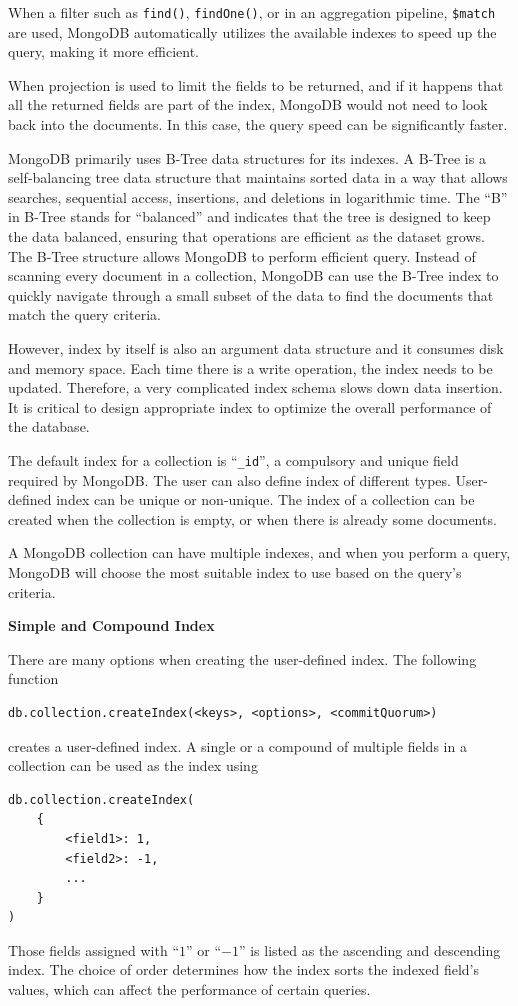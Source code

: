 When a filter such as \verb|find()|, \verb|findOne()|, or in an aggregation pipeline, \verb|$match| are used, MongoDB automatically utilizes the available indexes to speed up the query, making it more efficient.

When projection is used to limit the fields to be returned, and if it happens that all the returned fields are part of the index, MongoDB would not need to look back into the documents. In this case, the query speed can be significantly faster.

\begin{shortbox}

MongoDB primarily uses B-Tree data structures for its indexes. A B-Tree is a self-balancing tree data structure that maintains sorted data in a way that allows searches, sequential access, insertions, and deletions in logarithmic time. The ``B'' in B-Tree stands for ``balanced'' and indicates that the tree is designed to keep the data balanced, ensuring that operations are efficient as the dataset grows. The B-Tree structure allows MongoDB to perform efficient query. Instead of scanning every document in a collection, MongoDB can use the B-Tree index to quickly navigate through a small subset of the data to find the documents that match the query criteria.
\end{shortbox}

However, index by itself is also an argument data structure and it consumes disk and memory space. Each time there is a write operation, the index needs to be updated. Therefore, a very complicated index schema slows down data insertion. It is critical to design appropriate index to optimize the overall performance of the database.

The default index for a collection is ``\verb|_id|'', a compulsory and unique field required by MongoDB. The user can also define index of different types. User-defined index can be unique or non-unique. The index of a collection can be created when the collection is empty, or when there is already some documents.

A MongoDB collection can have multiple indexes, and when you perform a query, MongoDB will choose the most suitable index to use based on the query's criteria.

\vspace{0.1in}
\noindent \textbf{Simple and Compound Index}
\vspace{0.1in}

There are many options when creating the user-defined index. The following function 
\begin{lstlisting}
db.collection.createIndex(<keys>, <options>, <commitQuorum>)
\end{lstlisting}
creates a user-defined index. A single or a compound of multiple fields in a collection can be used as the index using
\begin{lstlisting}
db.collection.createIndex(
	{
		<field1>: 1,
		<field2>: -1,
		...
	}
)
\end{lstlisting}
Those fields assigned with ``$1$'' or ``$-1$'' is listed as the ascending and descending index. The choice of order determines how the index sorts the indexed field's values, which can affect the performance of certain queries.

